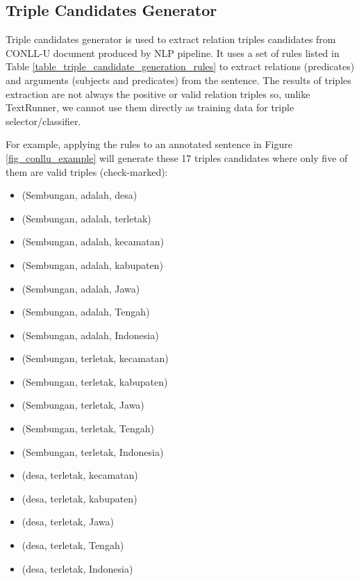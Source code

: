 \documentclass[conference,compsoc,12pt]{IEEEtran}
\begin{document}
\subsection{Triple Candidates Generator} \label{Triple Candidates Generator}


Triple candidates generator is used to extract relation triples candidates from CONLL-U document produced by NLP pipeline. It uses a set of rules listed in Table \ref{table_triple_candidate_generation_rules} to extract relations (predicates) and arguments (subjects and predicates) from the sentence. The results of triples extraction are not always the positive or valid relation triples so, unlike TextRunner\cite{banko2007open}, we cannot use them directly as training data for triple selector/classifier.

For example, applying the rules to an annotated sentence in Figure \ref{fig_conllu_example} will generate these 17 triples candidates where only five of them are valid triples (check-marked):

\begin{itemize}
\item (Sembungan, adalah, desa) 
\item (Sembungan, adalah, terletak)
\item (Sembungan, adalah, kecamatan)
\item (Sembungan, adalah, kabupaten)
\item (Sembungan, adalah, Jawa)
\item (Sembungan, adalah, Tengah)
\item (Sembungan, adalah, Indonesia)
\item (Sembungan, terletak, kecamatan) 
\item (Sembungan, terletak, kabupaten) 
\item (Sembungan, terletak, Jawa) 
\item (Sembungan, terletak, Tengah)
\item (Sembungan, terletak, Indonesia) 
\item (desa, terletak, kecamatan)
\item (desa, terletak, kabupaten)
\item (desa, terletak, Jawa)
\item (desa, terletak, Tengah)
\item (desa, terletak, Indonesia)
\end{itemize}
\end{document}
